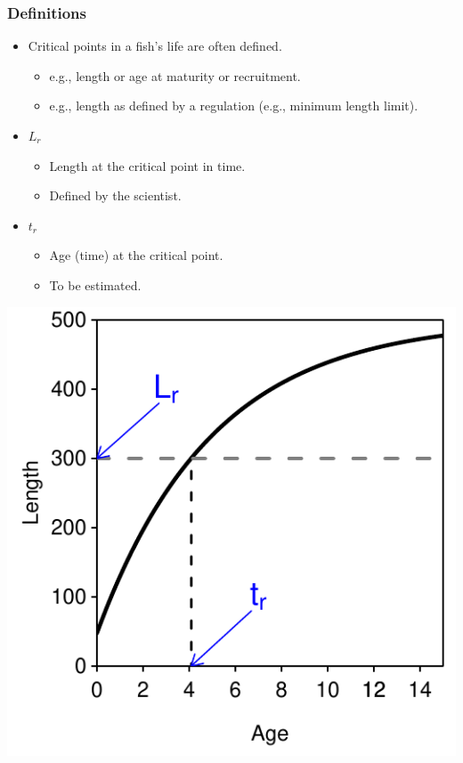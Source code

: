 \documentclass[xcolor=dvipsnames,t]{beamer}\usepackage[]{graphicx}\usepackage[]{color}
\newenvironment{knitrout}{}{} %
\begin{document}
\begin{frame}[fragile]
\frametitle{Definitions}
\begin{itemize}
  \item Critical points in a fish's life are often defined.
  \begin{itemize}
    \item e.g., length or age at maturity or recruitment.
    \item e.g., length as defined by a regulation (e.g., minimum length limit).
  \end{itemize}
\end{itemize}
\smallskip
\begin{minipage}[t]{0.6\textwidth}
  \begin{itemize}
    \item $L_{r}$
    \begin{itemize}
      \item Length at the critical point in time.
      \item Defined by the scientist.
    \end{itemize}
    \smallskip
    \item $t_{r}$
    \begin{itemize}
      \item Age (time) at the critical point.
      \item To be estimated.
    \end{itemize}
  \end{itemize}
\end{minipage}%
\hspace*{-2cm}
\begin{minipage}[t]{0.7\textwidth}
\begin{knitrout}\footnotesize
{}\color{fgcolor}

{\centering \includegraphics[width=.6\linewidth]{Figs/defn2-1} 

}



\end{knitrout}
\end{minipage}%
\end{frame}
\end{document}
